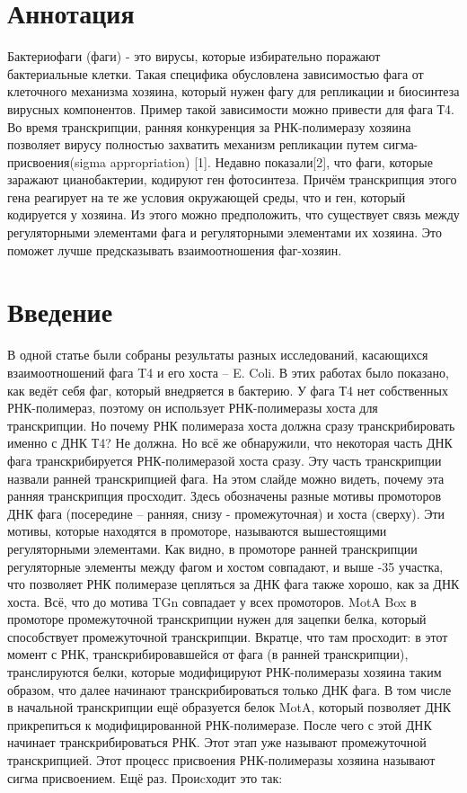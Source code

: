 \documentclass[a4paper,12pt]{article}
\begin{document}


\newpage
\section{Аннотация}

    Бактериофаги (фаги) - это вирусы, которые избирательно поражают бактериальные клетки. Такая специфика обусловлена зависимостью фага от клеточного механизма хозяина, который нужен фагу для репликации и биосинтеза вирусных компонентов. Пример такой зависимости  можно привести для фага Т4. Во время транскрипции, ранняя конкуренция за РНК-полимеразу хозяина позволяет вирусу полностью захватить механизм репликации путем сигма-присвоения(sigma appropriation) [1]. Недавно показали[2], что фаги, которые заражают цианобактерии, кодируют ген фотосинтеза. Причём транскрипция этого гена реагирует на те же условия окружающей среды, что и ген, который кодируется у хозяина. Из этого можно предположить, что существует связь между регуляторными элементами фага и регуляторными элементами их хозяина. Это поможет лучше предсказывать взаимоотношения фаг-хозяин.

\newpage
\tableofcontents



\newpage
\section{Введение}

    В одной статье были собраны результаты разных исследований, касающихся взаимоотношений фага T4 и его хоста – E. Coli. В этих работах было показано, как ведёт себя фаг, который внедряется в бактерию.
	У фага Т4 нет собственных РНК-полимераз, поэтому он использует РНК-полимеразы хоста для транскрипции. Но почему РНК полимераза хоста должна сразу транскрибировать именно с ДНК Т4? Не должна. Но всё же обнаружили, что некоторая часть ДНК фага транскрибируется РНК-полимеразой хоста сразу. Эту часть транскрипции назвали ранней транскрипцией фага. На этом слайде можно видеть, почему эта ранняя транскрипция просходит. Здесь обозначены разные мотивы промоторов ДНК фага (посередине – ранняя, снизу - промежуточная) и хоста (сверху). Эти мотивы, которые находятся в промоторе, называются вышестоящими регуляторными элементами. Как видно, в промоторе ранней транскрипции регуляторные элементы между фагом и хостом совпадают, и выше -35 участка, что позволяет РНК полимеразе цепляться за ДНК фага также хорошо, как за ДНК хоста.  Всё, что до мотива TGn совпадает у всех промоторов. MotA Box в промоторе промежуточной транскрипции нужен для зацепки белка, который способствует промежуточной транскрипции. Вкратце, что там просходит: в этот момент с РНК, транскрибировавшейся от фага (в ранней транскрипции), транслируются белки, которые модифицируют РНК-полимеразы хозяина таким образом, что далее начинают транскрибироваться только ДНК фага. В том числе в начальной транскрипции ещё образуется белок MotA, который позволяет ДНК прикрепиться к модифицированной РНК-полимеразе. После чего с этой ДНК начинает транскрибироваться РНК. Этот этап уже называют промежуточной транскрипцией. Этот процесс присвоения РНК-полимеразы хозяина называют сигма присвоением. Ещё раз. Проиcходит это так:
\end{document}
